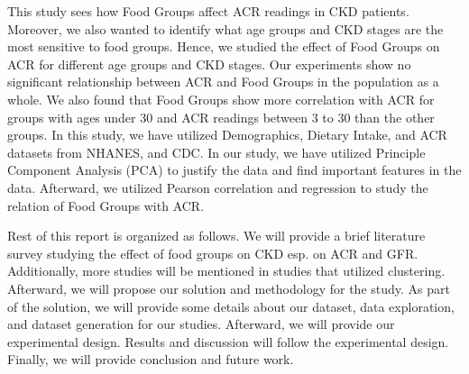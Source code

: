 \flushleft \justifying This study sees how Food Groups affect ACR readings in CKD patients. Moreover, we also wanted to identify what age groups and CKD stages are the most sensitive to food groups. Hence, we studied the effect of Food Groups on ACR for different age groups and CKD stages. Our experiments show no significant relationship between ACR and Food Groups in the population as a whole. We also found that Food Groups show more correlation with ACR for groups with ages under 30 and ACR readings between 3 to 30 than the other groups. In this study, we have utilized Demographics, Dietary Intake, and ACR datasets from NHANES, and CDC. In our study, we have utilized Principle Component Analysis (PCA) to justify the data and find important features in the data. Afterward, we utilized Pearson correlation and regression to study the relation of Food Groups with ACR.

\flushleft \justifying Rest of this report is organized as follows. We will provide a brief literature survey studying the effect of food groups on CKD esp. on ACR and GFR. Additionally, more studies will be mentioned in studies that utilized clustering. Afterward, we will propose our solution and methodology for the study. As part of the solution, we will provide some details about our dataset, data exploration, and dataset generation for our studies. Afterward, we will provide our experimental design. Results and discussion will follow the experimental design. Finally, we will provide conclusion and future work.
